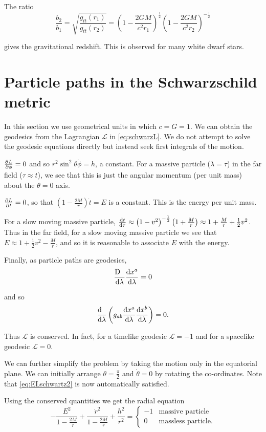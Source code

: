 \documentclass{notes}
\newcommand{\dif}[1]{\frac{\ud\phantom{#1}}{\ud#1}}
\newcommand{\cL}{\mathcal{L}}
\begin{document}
The ratio
\[
\frac{b_2}{b_1} = \sqrt{\frac{g_{tt}(r_1)}{g_{tt}(r_2)}}
= \left( 1 - \frac{2 G M}{c^2 r_1} \right)^{\frac{1}{2}}
\left( 1 - \frac{2 G M}{c^2 r_2} \right)^{-\frac{1}{2}}
\]

gives the gravitational redshift.  This is observed for many white
dwarf stars.

\section[Particle and photon paths]%
{Particle paths in the Schwarzschild metric}

In this section we use geometrical units in which $c = G = 1$.
We can obtain the geodesics from the Lagrangian $\cL$ in
\eqref{eq:schwarzL}.  We do not attempt to solve the geodesic
equations directly but instead seek first integrals of the motion.

$\frac{\partial L}{\partial \phi} = 0$ and so $r^2 \sin^2 \theta \Dot{\phi} = h$,
a constant.  For a massive particle ($\lambda = \tau$) in
the far field ($\tau \approx t$), we see that this is
just the angular momentum (per unit mass) about the $\theta = 0$ axis.

$\frac{\partial L}{\partial t} = 0$, so that $\left( 1 - \tfrac{2 M}{r}\right)
\Dot{t} = E$ is a constant.  This is the energy per unit mass.

For a slow moving massive particle, $\frac{\mathrm{d} t}{\mathrm{d}\tau}
\approx \left( 1 - v^2 \right)^{-\frac{1}{2}} \left( 1 + \tfrac{M}{r}\right)
\approx 1 + \tfrac{M}{r} + \tfrac{1}{2} v^2$.  Thus in the far
field, for a slow moving massive particle we see that
$E \approx 1 + \tfrac{1}{2} v^2 - \tfrac{M}{r}$, and so it is reasonable
to associate $E$ with the energy.

Finally, as particle paths are geodesics,
\[
\frac{\mathrm{D}\phantom{\lambda}}{\mathrm{d}\lambda} \frac{\mathrm{d} x^a}{\mathrm{d}\lambda} = 0
\]

and so
\[
\dif{\lambda} \left( g_{a b} \diff{x^a}{\lambda}
\diff{x^b}{\lambda} \right) = 0.
\]

Thus $\cL$ is conserved.  In fact, for a timelike geodesic $\cL = - 1$
and for a spacelike geodesic $\cL = 0$.

We can further simplify the problem by taking the motion only
in the equatorial plane.  We can initially arrange
$\theta = \tfrac{\pi}{2}$ and $\Dot{\theta} = 0$ by rotating
the co-ordinates.  Note that \eqref{eq:ELschwartz2} is
now automatically satisfied.

Using the conserved quantities we get the radial equation
\[
- \frac{E^2}{1 - \frac{2 M}{r}} + \frac{\Dot{r}^2}{1-\frac{2 M}{r}}
+ \frac{h^2}{r^2} = \begin{cases}
-1 & \text{massive particle} \\
0 & \text{massless particle.}
\end{cases}
\]
\end{document}
